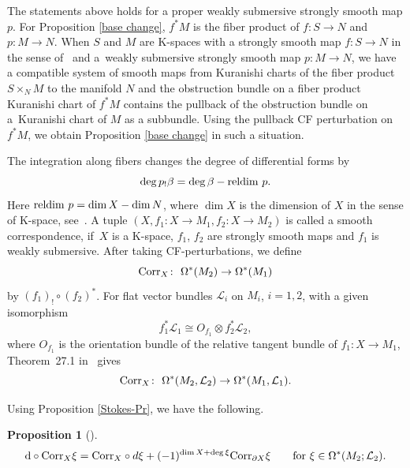 \documentclass[pdftex]{sigma}
\numberwithin{equation}{section}
\newtheorem{prop}[thm]{Proposition}
\theoremstyle{definition}
\begin{document}
The statements above holds for a proper weakly submersive strongly smooth map $p$.
For Proposition \ref{base change}, $f^*M$ is the fiber product of $f\colon S \to N$ and $p\colon M \to N$.
When $S$ and $M$ are K-spaces with a strongly smooth map $f\colon S \to N$ in the sense of~\cite[Definition 3.40\,(4)]{FOOO20}
and a~weakly submersive strongly smooth map $p\colon M \to N$,
we have a compatible system of smooth maps from Kuranishi charts of the fiber product $S \times_N M$ to the manifold $N$ and
the obstruction bundle on a fiber product Kuranishi chart of $f^*M$ contains the pullback of the obstruction bundle on a~Kuranishi chart of $M$
as a subbundle.
Using the pullback CF perturbation on~$f^*M$, we obtain Proposition \ref{base change} in such a situation.

The integration along fibers changes the degree of differential forms by
\begin{equation}\label{deg pushout}
 \deg p_! \beta = \deg \beta - {\rm reldim}\ p.
 \end{equation}
Here ${\rm reldim} \ p = \dim X - \dim N$, where $\dim X$ is the dimension of $X$ in the sense of K-space, see~\cite[p.~52]{FOOO20}.
A tuple $(X, f_1\colon X \to M_1, f_2\colon X \to M_2)$ is called a smooth correspondence, if~$X$ is a K-space, $f_1$, $f_2$ are strongly smooth maps
and $f_1$ is weakly submersive.  After taking CF-perturbations, we define
\[{\rm Corr}_X\colon \ \Omega^*(M_2) \to \Omega^*(M_1)\]
by $(f_1)_! \circ (f_2)^*$.
For flat vector bundles ${\mathcal L}_i$ on $M_i$, $i = 1,2$, with a given isomorphism
\[f_1^* {\mathcal L}_1 \cong O_{f_1} \otimes f_2^* {\mathcal L}_2,\] where $O_{f_1}$ is the orientation bundle of the relative tangent bundle
of $f_1\colon X \to M_1$, Theorem~27.1 in~\cite{FOOO09II} gives
\[{\rm Corr}_X\colon \ \Omega^*(M_2, {\mathcal L}_2) \to \Omega^*(M_1, {\mathcal L}_1).\]

Using Proposition \ref{Stokes-Pr}, we have the following.

\begin{prop}[{\cite[Proposition 27.2]{FOOO20}}]\label{corrStokes}
\[  {\rm d} \circ {\rm Corr}_X \xi = {\rm Corr}_X \circ d \xi + (-1)^{\dim X + \deg \xi} {\rm Corr}_{\partial X} \xi \qquad {\rm for} \ \xi \in \Omega^*(M_2; {\mathcal L}_2).
\]
\end{prop}
\end{document}
